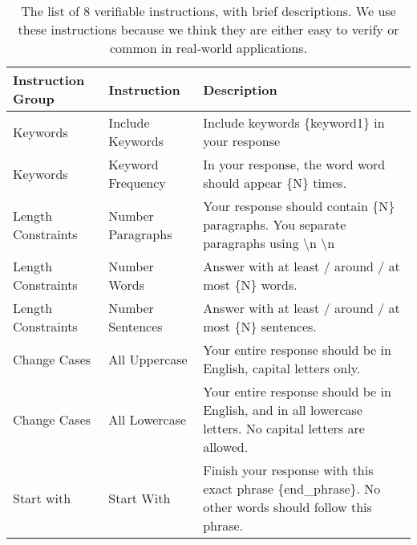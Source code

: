 \begin{table*}[htbp]
\centering
\small
\begin{tabular}{l|p{2.6cm}|p{9cm}}
\toprule
\textbf{Instruction Group} & \textbf{Instruction} & \textbf{Description} \\
\midrule
Keywords & Include Keywords & Include keywords \{keyword1\} in your response \\
Keywords & Keyword Frequency & In your response, the word {word} should appear \{N\} times. \\
\midrule
Length Constraints & Number Paragraphs & Your response should contain \{N\} paragraphs. You separate paragraphs using \textbackslash n \textbackslash n \\
Length Constraints & Number Words & Answer with at least / around / at most \{N\} words. \\
Length Constraints & Number Sentences & Answer with at least / around / at most \{N\} sentences. \\
\midrule
Change Cases & All Uppercase & Your entire response should be in English, capital letters only. \\
Change Cases & All Lowercase & Your entire response should be in English, and in all lowercase letters. No capital letters are allowed. \\
\midrule
Start with & Start With & Finish your response with this exact phrase \{end\_phrase\}. No other words should follow this phrase. \\
\bottomrule
\end{tabular}
\caption{The list of 8 verifiable instructions, with brief descriptions. We use these instructions because we think they are either easy to verify or common in real-world applications.}
\label{tab:list-of-verifiable-instruction}
\end{table*}